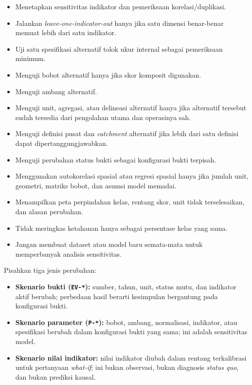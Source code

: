 \documentclass[
  indonesian,
  11pt,
]{article}
\providecommand{\tightlist}{%
  \setlength{\itemsep}{0pt}\setlength{\parskip}{0pt}}
\renewcommand{\tightlist}{%
  \setlength{\itemsep}{0.22em}%
  \setlength{\parskip}{0pt}%
}
\begin{document}
\begin{itemize}
\tightlist
\item[$\square$]
  Menetapkan sensitivitas indikator dan pemeriksaan korelasi/duplikasi.
\item[$\square$]
  Jalankan \emph{leave-one-indicator-out} hanya jika satu dimensi
  benar-benar memuat lebih dari satu indikator.
\item[$\square$]
  Uji satu spesifikasi alternatif tolok ukur internal sebagai
  pemeriksaan minimum.
\item[$\square$]
  Menguji bobot alternatif hanya jika skor komposit digunakan.
\item[$\square$]
  Menguji ambang alternatif.
\item[$\square$]
  Menguji unit, agregasi, atau delineasi alternatif hanya jika alternatif
  tersebut sudah tersedia dari pengolahan utama dan operasinya sah.
\item[$\square$]
  Menguji definisi pusat dan \emph{catchment} alternatif jika lebih dari
  satu definisi dapat dipertanggungjawabkan.
\item[$\square$]
  Menguji perubahan status bukti sebagai konfigurasi bukti terpisah.
\item[$\square$]
  Menggunakan autokorelasi spasial atau regresi spasial hanya jika
  jumlah unit, geometri, matriks bobot, dan asumsi model memadai.
\item[$\square$]
  Menampilkan peta perpindahan kelas, rentang skor, unit tidak
  terselesaikan, dan alasan perubahan.
\item[$\square$]
  Tidak meringkas ketahanan hanya sebagai persentase kelas yang sama.
\item[$\square$]
  Jangan membuat dataset atau model baru semata-mata untuk memperbanyak
  analisis sensitivitas.
\end{itemize}

Pisahkan tiga jenis perubahan:

\begin{itemize}
\tightlist
\item[$\square$]
  \textbf{Skenario bukti (\texttt{EV-*}):} sumber, tahun, unit, status
  mutu, dan indikator aktif berubah; perbedaan hasil berarti kesimpulan
  bergantung pada konfigurasi bukti.
\item[$\square$]
  \textbf{Skenario parameter (\texttt{P-*}):} bobot, ambang,
  normalisasi, indikator, atau spesifikasi berubah dalam konfigurasi
  bukti yang sama; ini adalah sensitivitas model.
\item[$\square$]
  \textbf{Skenario nilai indikator:} nilai indikator diubah dalam
  rentang terkalibrasi untuk pertanyaan \emph{what-if}; ini bukan
  observasi, bukan diagnosis \emph{status quo}, dan bukan prediksi
  kausal.
\end{itemize}
\end{document}

